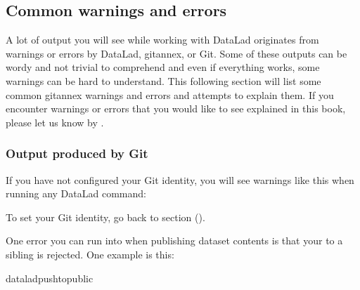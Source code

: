 \subsection{Common warnings and errors}
\label{\detokenize{basics/101-135-help:common-warnings-and-errors}}
\sphinxAtStartPar
A lot of output you will see while working with DataLad originates from warnings
or errors by DataLad, git\sphinxhyphen{}annex, or Git.
Some of these outputs can be wordy and not trivial to comprehend \sphinxhyphen{} and even if
everything works, some warnings can be hard to understand.
This following section will list some common git\sphinxhyphen{}annex warnings and errors and
attempts to explain them. If you encounter warnings or errors that you would
like to see explained in this book, please let us know by
.


\subsubsection{Output produced by Git}
\label{\detokenize{basics/101-135-help:output-produced-by-git}}
\sphinxAtStartPar
{}

\sphinxAtStartPar
If you have not configured your Git identity, you will
see warnings like this when running any DataLad command:

\begin{sphinxVerbatim}[commandchars=\\\{\}]
\end{sphinxVerbatim}

\sphinxAtStartPar
To set your Git identity, go back to section {\hyperref[\detokenize{intro/installation:installconfig}]{}} ().

\sphinxAtStartPar
{}

\sphinxAtStartPar
One error you can run into when publishing dataset contents is that your
 to a sibling is rejected.
One example is this:

\begin{sphinxVerbatim}[commandchars=\\\{\}]
dataladpush\PYGZhy{}\PYGZhy{}topublic
\end{sphinxVerbatim}

